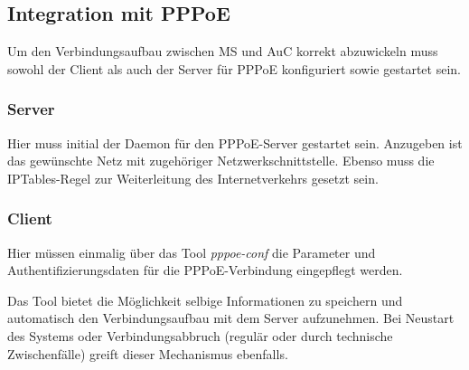	\subsection{Integration mit PPPoE}
        Um den Verbindungsaufbau zwischen \ac{MS} und \ac{AuC} korrekt abzuwickeln muss sowohl der Client
        als auch der Server für \ac{PPPoE} konfiguriert sowie gestartet sein.

		 \subsubsection{Server}
         Hier muss initial der Daemon für den \ac{PPPoE}-Server gestartet sein. Anzugeben ist das gewünschte
         Netz mit zugehöriger Netzwerkschnittstelle. Ebenso muss die IPTables-Regel zur Weiterleitung
         des Internetverkehrs gesetzt sein.

         \subsubsection{Client}
         Hier müssen einmalig über das Tool \textit{pppoe-conf} die Parameter und Authentifizierungsdaten
         für die \ac{PPPoE}-Verbindung eingepflegt werden.

         Das Tool bietet die Möglichkeit selbige Informationen
         zu speichern und automatisch den Verbindungsaufbau mit dem Server aufzunehmen. Bei Neustart
         des Systems oder Verbindungsabbruch (regulär oder durch technische Zwischenfälle) greift dieser
         Mechanismus ebenfalls.

\clearpage
